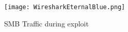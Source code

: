 \documentclass[
	letterpaper, %
	10pt, %
	unnumberedsections, %
	twoside, %
]{LTJournalArticle}
\begin{document}
\begin{figure}[ht] %
	\texttt{[image: WiresharkEternalBlue.png]}
	\caption{SMB Traffic during exploit}
	\label{fig:wiresharkDump}
\end{figure}































\end{document}
